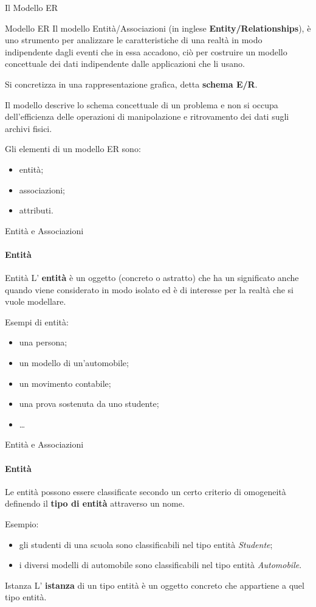 \begin{frame}{Il Modello ER}
\vspace{.5cm}
\begin{block}{Modello ER}
Il modello Entit\`a/Associazioni (in inglese \textbf{Entity/Relationships}), \`e uno strumento per analizzare le caratteristiche di una realt\`a in modo indipendente dagli eventi che in essa accadono, ci\`o per costruire un modello concettuale dei dati indipendente dalle applicazioni che li usano.

Si concretizza in una rappresentazione grafica, detta \textbf{schema E/R}.
\end{block}
\pause
Il modello descrive lo schema concettuale di un problema e non si occupa dell'efficienza delle operazioni di manipolazione e ritrovamento dei dati sugli archivi fisici.
\pause

Gli elementi di un modello ER sono:
\begin{itemize}
    \item entit\`a;
    \item associazioni;
    \item attributi.
\end{itemize}
\end{frame}
%
\begin{frame}{Entit\`a e Associazioni}
\framesubtitle{Entit\`a}
\begin{block}{Entit\`a}
L' \textbf{entit\`a} \`e un oggetto (concreto o astratto) che ha un significato anche quando viene considerato in modo isolato ed \`e di interesse per la realt\`a che si vuole modellare.
\end{block}
\pause
Esempi di entit\`a:
\begin{itemize}
    \item una persona;
    \item un modello di un'automobile;
    \item un movimento contabile;
    \item una prova sostenuta da uno studente;
    \item \ldots
\end{itemize}
\end{frame}
%
\begin{frame}{Entit\`a e Associazioni}
\framesubtitle{Entit\`a}
Le entit\`a possono essere classificate secondo un certo criterio di omogeneit\`a definendo il \textbf{tipo di entit\`a} attraverso un nome.
\pause
\vspace{.3cm}

Esempio:
\begin{itemize}
    \item gli studenti di una scuola sono classificabili nel tipo entit\`a \textit{Studente};
    \item i diversi modelli di automobile sono classificabili nel tipo entit\`a \textit{Automobile}.
\end{itemize}

\pause

\begin{block}{Istanza}
L' \textbf{istanza} di un tipo entit\`a \`e un oggetto concreto che appartiene a quel tipo entit\`a.
\end{block}
\end{frame}
